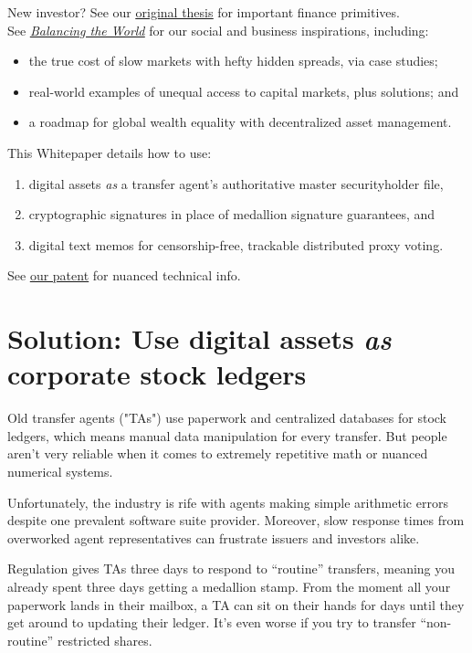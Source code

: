 \documentclass[11pt, english]{article}
\begin{document}
\begin{multicols}{2}
New investor? See our \underline{\href{http://thesis.blocktransfer.io}{original thesis}} for important finance primitives.\\

\noindent See \href{http://impact.blocktransfer.io}{\underline{\textit{Balancing the World}}} for our social and business inspirations, including:\begin{itemize}
    \item the true cost of slow markets with hefty hidden spreads, via case studies;
    \item real-world examples of unequal access to capital markets, plus solutions; and
    \item a roadmap for global wealth equality with decentralized asset management.
\end{itemize}

\noindent This Whitepaper details how to use: \begin{enumerate}
    \item digital assets \textit{as} a transfer agent's authoritative master securityholder file,
    \item cryptographic signatures in place of medallion signature guarantees, and
    \item digital text memos for censorship-free, trackable distributed proxy voting.
\end{enumerate} See \underline{\href{https://patentcenter.uspto.gov/applications/17396742}{our patent}} for nuanced technical info.

\section{Solution: Use digital assets \textit{as} corporate stock ledgers}

Old transfer agents ("TAs") use paperwork and centralized databases for stock ledgers, which means manual data manipulation for every transfer. But people aren't very reliable when it comes to extremely repetitive math or nuanced numerical systems.

Unfortunately, the industry is rife with agents making simple arithmetic errors despite one prevalent software suite provider. Moreover, slow response times from overworked agent representatives can frustrate issuers and investors alike.

Regulation gives TAs three days to respond to ``routine'' transfers, meaning you already spent three days getting a medallion stamp. From the moment all your paperwork lands in their mailbox, a TA can sit on their hands for days until they get around to updating their ledger. It's even worse if you try to transfer ``non-routine'' restricted shares. 


\end{multicols}
\end{document}
